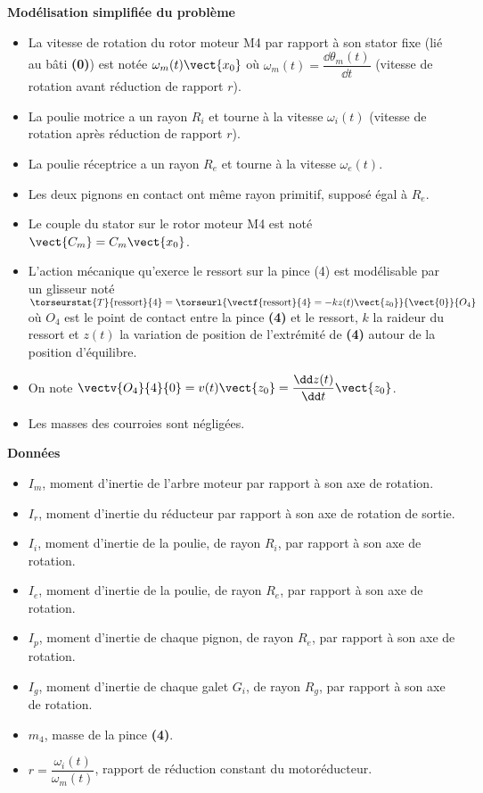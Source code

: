 \begin{multicols}{2}
\textbf{Modélisation simplifiée du problème}
\begin{itemize}
\item La vitesse de rotation du rotor moteur M4 par rapport à son stator fixe (lié au bâti \textbf{(0)}) est notée $\omega_m(t)\vect{x_0}$  où $\omega_m(t)=\dfrac{\dd \theta_m(t)}{\dd t}$  (vitesse de rotation avant réduction de rapport $r$).
\item La poulie motrice a un rayon $R_i$ et tourne à la vitesse $\omega_i(t)$ (vitesse de rotation après réduction de rapport $r$).
\item La poulie réceptrice a un rayon $R_e$ et tourne à la vitesse $\omega_e(t)$.
\item Les deux pignons en contact ont même rayon primitif, supposé égal à $R_e$.
\item Le couple du stator sur le rotor moteur M4 est noté  $\vect{C_m}=C_m \vect{x_0}$.
\item L’action mécanique qu’exerce le ressort sur la pince (4) est modélisable par un glisseur noté 
$\torseurstat{T}{\text{ressort}}{4}=\torseurl{\vectf{\text{ressort}}{4}=-kz(t)\vect{z_0}}{\vect{0}}{O_4}$ où $O_4$ est le point de contact entre la pince \textbf{(4)} et le ressort, $k$ la raideur du ressort et $z(t)$ la variation de position de l’extrémité de \textbf{(4)} autour de la position d’équilibre.
\item On note $\vectv{O_4}{4}{0}=v(t)\vect{z_0}=\dfrac{\dd z(t)}{\dd t}\vect{z_0}$.
\item Les masses des courroies sont négligées.
\end{itemize}

\textbf{Données}
\begin{itemize}
\item $I_m$, moment d’inertie de l’arbre moteur par rapport à son axe de rotation.
\item $I_r$, moment d’inertie du réducteur par rapport à son axe de rotation de sortie.
\item $I_i$, moment d’inertie de la poulie, de rayon $R_i$, par rapport à son axe de rotation.
\item $I_e$, moment d’inertie de la poulie, de rayon $R_e$, par rapport à son axe de rotation.
\item $I_p$, moment d’inertie de chaque pignon, de rayon $R_e$, par rapport à son axe de rotation.
\item $I_g$, moment d’inertie de chaque galet $G_i$, de rayon $R_g$, par rapport à son axe de rotation.
\item $m_4$, masse de la pince \textbf{(4)}.
\item $r=\dfrac{\omega_i(t)}{\omega_m(t)}$, rapport de réduction constant du motoréducteur.
\end{itemize}


\end{multicols}
